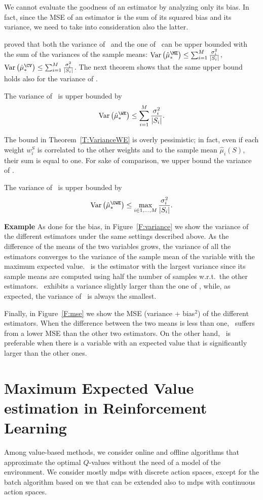 We cannot evaluate the goodness of an estimator by analyzing only its bias.
In fact, since the MSE of an estimator is the sum of its squared bias and its variance, we need to take into consideration also the latter.

\citet{van2013estimating} proved that both the variance of \ME~and the one of \CV~can be upper bounded with the sum of the variances of the sample means:
$ \mathrm{Var}\left(\est{\ME}\right) \leq \sum_{i=1}^M \frac{\sigma^2_i}{|S_i|}$, $\mathrm{Var}\left(\est{\CV}\right) \leq \sum_{i=1}^M \frac{\sigma^2_i}{|S_i|}$.
The next theorem shows that the same upper bound holds also for the variance of \WE.
\begin{theorem}\label{T:VarianceWE}
 The variance of \WE~is upper bounded by
 $$\mathrm{Var}\left(\est{\WE}\right) \leq \sum_{i=1}^M \frac{\sigma^2_i}{|S_i|}.$$
\end{theorem}
The bound in Theorem~\ref{T:VarianceWE} is overly pessimistic; in fact, even if each weight $w_i^S$ is correlated to the other weights and to the sample mean $\hat\mu_i(S)$, their sum is equal to one.
For sake of comparison, we upper bound the variance of \OWE.
\begin{theorem}\label{T:VarianceOWE}
 The variance of \OWE~is upper bounded by
 $$\mathrm{Var}\left(\est{\OWE}\right) \leq \max_{i\in{1,\dots,M}} \frac{\sigma^2_i}{|S_i|}.$$
\end{theorem}

\textbf{Example} As done for the bias, in Figure~\ref{F:variance} we show the variance of the different estimators under the same settings described above.
As the difference of the means of the two variables grows, the variance of all the estimators converges to the variance of the sample mean of the variable with the maximum expected value.
\CV~is the estimator with the largest variance since its sample means are computed using half the number of samples w.r.t.~the other estimators.
\WE~exhibits a variance slightly larger than the one of \ME, while, as expected, the variance of \OWE~is always the smallest.

Finally, in Figure~\ref{F:mse} we show the MSE (variance + bias$^2$) of the different estimators.
When the difference between the two means is less than one, \WE~suffers from a lower MSE than the other two estimators.
On the other hand, \ME~is preferable when there is a variable with an expected value that is significantly larger than the other ones.

\section{Maximum Expected Value estimation in Reinforcement Learning}
Among value-based methods, we consider online and offline algorithms that approximate the optimal $Q$-values without the need of a model of the environment. We consider mostly \glspl{mdp} with discrete action spaces, except for the batch algorithm based on \gls{we} that can be extended also to \glspl{mdp} with continuous action spaces.

